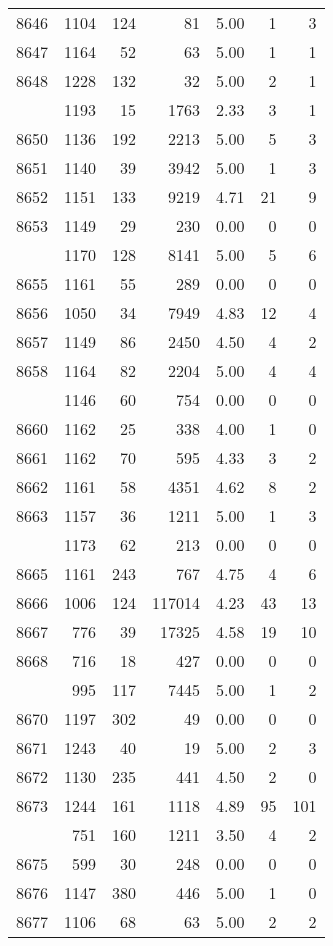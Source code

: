 \documentclass[
]{article}
\begin{document}
\begin{table}
\begin{tabular}[t]{lrrrrrr}
8646 & 1104 & 124 & 81 & 5.00 & 1 & 3\\
8647 & 1164 & 52 & 63 & 5.00 & 1 & 1\\
8648 & 1228 & 132 & 32 & 5.00 & 2 & 1\\
\addlinespace
8649 & 1193 & 15 & 1763 & 2.33 & 3 & 1\\
8650 & 1136 & 192 & 2213 & 5.00 & 5 & 3\\
8651 & 1140 & 39 & 3942 & 5.00 & 1 & 3\\
8652 & 1151 & 133 & 9219 & 4.71 & 21 & 9\\
8653 & 1149 & 29 & 230 & 0.00 & 0 & 0\\
\addlinespace
8654 & 1170 & 128 & 8141 & 5.00 & 5 & 6\\
8655 & 1161 & 55 & 289 & 0.00 & 0 & 0\\
8656 & 1050 & 34 & 7949 & 4.83 & 12 & 4\\
8657 & 1149 & 86 & 2450 & 4.50 & 4 & 2\\
8658 & 1164 & 82 & 2204 & 5.00 & 4 & 4\\
\addlinespace
8659 & 1146 & 60 & 754 & 0.00 & 0 & 0\\
8660 & 1162 & 25 & 338 & 4.00 & 1 & 0\\
8661 & 1162 & 70 & 595 & 4.33 & 3 & 2\\
8662 & 1161 & 58 & 4351 & 4.62 & 8 & 2\\
8663 & 1157 & 36 & 1211 & 5.00 & 1 & 3\\
\addlinespace
8664 & 1173 & 62 & 213 & 0.00 & 0 & 0\\
8665 & 1161 & 243 & 767 & 4.75 & 4 & 6\\
8666 & 1006 & 124 & 117014 & 4.23 & 43 & 13\\
8667 & 776 & 39 & 17325 & 4.58 & 19 & 10\\
8668 & 716 & 18 & 427 & 0.00 & 0 & 0\\
\addlinespace
8669 & 995 & 117 & 7445 & 5.00 & 1 & 2\\
8670 & 1197 & 302 & 49 & 0.00 & 0 & 0\\
8671 & 1243 & 40 & 19 & 5.00 & 2 & 3\\
8672 & 1130 & 235 & 441 & 4.50 & 2 & 0\\
8673 & 1244 & 161 & 1118 & 4.89 & 95 & 101\\
\addlinespace
8674 & 751 & 160 & 1211 & 3.50 & 4 & 2\\
8675 & 599 & 30 & 248 & 0.00 & 0 & 0\\
8676 & 1147 & 380 & 446 & 5.00 & 1 & 0\\
8677 & 1106 & 68 & 63 & 5.00 & 2 & 2\\

\end{tabular}
\end{table}
\end{document}
